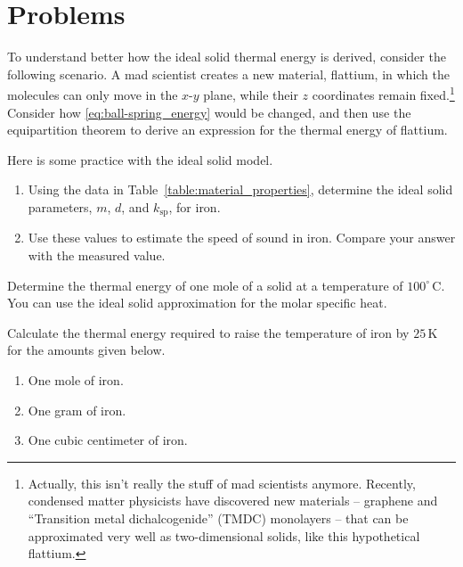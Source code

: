 \section*{Problems}

\begin{exercise}
  To understand better how the ideal solid thermal energy
  is derived, consider the following scenario.
  A mad scientist creates a new material, flattium, in which the
  molecules can only move in the $x$-$y$ plane, while their $z$
  coordinates remain fixed.\footnote{Actually, this isn't really the
  stuff of mad scientists anymore. Recently, condensed matter
  physicists have discovered new materials -- graphene and ``Transition
  metal dichalcogenide'' (TMDC) monolayers -- that can be
  approximated very well as two-dimensional solids, like this
  hypothetical flattium.}  Consider how \eqref{eq:ball-spring_energy} 
  would be changed, and then use the equipartition theorem to derive an 
  expression for the thermal energy of flattium.
\label{problem:flattium}
\end{exercise}

\begin{exercise}
  Here is some practice with the ideal solid model.
\begin{enumerate}
\item Using the data in Table~\ref{table:material_properties},
  determine the ideal solid parameters, $m$, $d$, and $k_\text{sp}$,
  for iron.
\item Use these values to estimate the speed of sound in iron.
  Compare your answer with the measured value.
\end{enumerate}
\label{problem:ball-spring_iron}
\end{exercise}

\begin{exercise}
  Determine the thermal energy of one mole of a solid at a temperature of
  $100^\circ\,\text{C}$.  You can use the ideal solid
  approximation for the molar specific heat.
  \label{problem:iron_E_thermal}
\end{exercise}




\begin{exercise} 
  Calculate the thermal energy required to raise the temperature of
  iron by $25\,\text{K}$ for the amounts given below.
\begin{enumerate}
\item One mole of iron.
\item One gram of iron.
\item One cubic centimeter of iron.
\end{enumerate}
\label{problem:mole_kg_cc}
\end{exercise}


